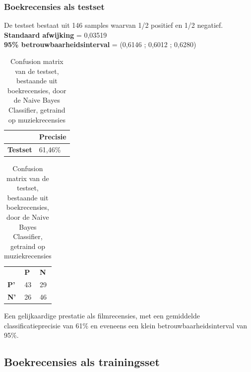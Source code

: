 \begin{appendices}
\subsubsection{Boekrecensies als testset}\label{Boekrecensies als testset}

De testset bestaat uit 146 samples waarvan 1/2 positief en 1/2 negatief.\\

\textbf{Standaard afwijking} = 0,03519\\
\textbf{95\% betrouwbaarheidsinterval} = (0,6146 ; 0,6012 ; 0,6280)
 
\begin{table}[h]
\centering
\setlength\tabcolsep{4pt}
\begin{minipage}[t]{0.48\textwidth}
\centering
\begin{tabular}{l|l|}
\cline{2-2}
                                            & \textbf{Precisie} \\ \hline
\multicolumn{1}{|l|}{\textbf{Testset}}      & 61,46\%           \\ \hline
\end{tabular}
\caption{Classificatieprecisie Naive Bayes Classifier, getraind op muziekrecensies, getest op boekrecensies}
\end{minipage}%
\hfill
\begin{minipage}[t]{0.48\textwidth}
\centering
\begin{tabular}{lll}
                                 & \textbf{P}               & \textbf{N}               \\ \cline{2-3} 
\multicolumn{1}{l|}{\textbf{P'}} & \multicolumn{1}{l|}{43} & \multicolumn{1}{l|}{29} \\ \cline{2-3} 
\multicolumn{1}{l|}{\textbf{N'}} & \multicolumn{1}{l|}{26} & \multicolumn{1}{l|}{46} \\ \cline{2-3} 
\end{tabular}
\caption{Confusion matrix van de testset, bestaande uit boekrecensies, door de  Naive Bayes Classifier, getraind op muziekrecensies} 
\end{minipage}
\end{table}


Een gelijkaardige prestatie als filmrecensies, met een gemiddelde classificatieprecisie van 61\% en eveneens een klein betrouwbaarheidsinterval van 95\%.

\subsection{Boekrecensies als trainingsset}\label{Boekrecensies als trainingsset}


\end{appendices}

